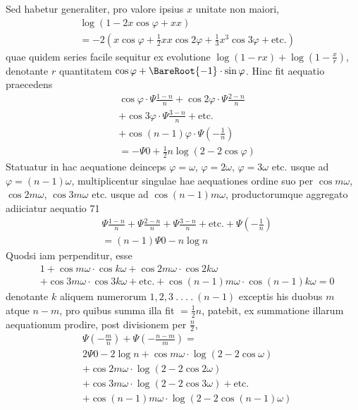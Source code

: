Sed habetur generaliter, pro valore ipsius $x$ unitate non maiori,
\[
\begin{aligned}
&\log(1-2x\cos\varphi+xx)\\[4pt]
&=-2(x\cos\varphi+\tfrac12xx\cos2\varphi+\tfrac13x^3\cos3\varphi+\text{etc.})
\end{aligned}
\]
quae quidem series facile sequitur ex evolutione $\log(1-rx)+\log\left(1-\frac xr\right)$, denotante $r$ quantitatem $\cos\varphi+\BareRoot{-1}\cdot\sin\varphi$. Hinc fit aequatio praecedens
\[
\begin{aligned}
&\cos\varphi\cdot\Psi\frac{1-n}{n}+\cos2\varphi\cdot\Psi\frac{2-n}{n}\\[4pt]
&+\cos3\varphi\cdot\Psi\frac{3-n}{n}+\text{etc.}\\[4pt]
&+\cos(n-1)\varphi\cdot\Psi\left(-\frac1n\right)
\\[4pt]
&=-\Psi0+\tfrac12n\log(2-2\cos\varphi)
\end{aligned}
\tag*{[72]}\]
Statuatur in hac aequatione deinceps $\varphi=\omega$, $\varphi=2\omega$, $\varphi=3\omega$ etc. usque ad $\varphi=(n-1)\omega$, multiplicentur singulae hae aequationes ordine suo per $\cos m\omega$, $\cos2m\omega$, $\cos3m\omega$ etc. usque ad $\cos(n-1)m\omega$, productorumque aggregato adiiciatur aequatio 71
\[
\begin{aligned}
&\Psi\frac{1-n}{n}+\Psi\frac{2-n}{n}+\Psi\frac{3-n}{n}+\text{etc.}+\Psi\left(-\frac1n\right)\\[4pt]
&=(n-1)\Psi0-n\log n
\end{aligned}
\]
Quodsi iam perpenditur, esse
\[
\begin{aligned}
&1+\cos m\omega\cdot\cos k\omega+\cos2m\omega\cdot\cos2k\omega\\[4pt]
&+\cos3m\omega\cdot\cos3k\omega
+\text{etc.}+\cos(n-1)m\omega\cdot\cos(n-1)k\omega=0
\end{aligned}
\]
denotante $k$ aliquem numerorum $1,2,3\ .\ .\ .\ .\ (n-1)$ exceptis his duobus $m$ atque $n-m$, pro quibus summa illa fit $=\tfrac12n$, patebit, ex summatione illarum aequationum prodire, post divisionem per $\frac n2$,
\[
\begin{aligned}
&\Psi\left(-\frac mn\right)+\Psi\left(-\frac{n-m}{m}\right)=
\\[4pt]
&2\Psi0-2\log n+\cos m\omega\cdot\log(2-2\cos\omega)\\[4pt]
&+\cos2m\omega\cdot\log(2-2\cos2\omega)
\\[4pt]
&+\cos3m\omega\cdot\log(2-2\cos3\omega)+\text{etc.}\\[4pt]
&+\cos(n-1)m\omega\cdot\log(2-2\cos(n-1)\omega)
\end{aligned}
\tag*{[73]}\]
